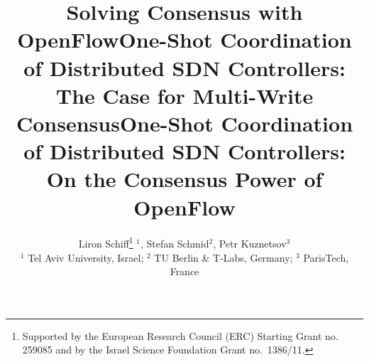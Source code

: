 \documentclass[conference]{sigcomm-alternate}
\begin{document}
\sloppy




\title{Solving Consensus with OpenFlow}

\title{One-Shot Coordination of Distributed SDN Controllers:\\The Case for Multi-Write Consensus}

\title{One-Shot Coordination of Distributed SDN Controllers:\\On the Consensus Power of OpenFlow}


\author{
Liron Schiff\thanks{Supported by the European Research Council (ERC) Starting Grant no. 259085 and by the Israel Science Foundation Grant no.~1386/11.} $^1$, 
Stefan Schmid$^2$, Petr Kuznetsov$^3$ \\
\small $^1$ Tel Aviv University, Israel; $^2$ TU Berlin \& T-Labs, Germany; $^3$ ParisTech, France
}


\date{}


\maketitle


\thispagestyle{empty}


\end{document}
